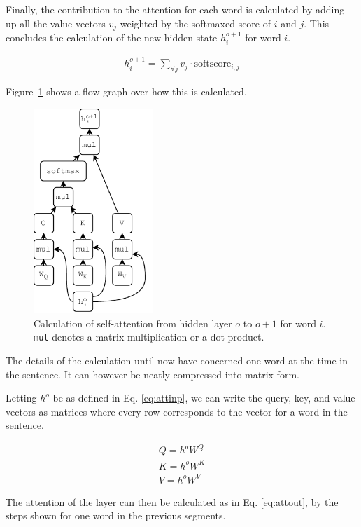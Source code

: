 Finally, the contribution to the attention for each word is calculated by adding up all the value vectors $v_j$ weighted by the softmaxed score of $i$ and $j$. This concludes the calculation of the new hidden state $h_i^{o+1}$ for word $i$. 

\begin{align}
    h_i^{o+1} = \sum\limits_{\forall j} v_j \cdot  \text{softscore}_{i,j} 
\end{align}

 Figure~\ref{fig:attflow} shows a flow graph over how this is calculated. 

\begin{figure}[ht]
    \centering
    \includegraphics[width=0.4\textwidth]{Figures/figs-self-att.pdf}
    \caption{Calculation of self-attention from hidden layer $o$ to $o+1$ for word $i$. \texttt{mul} denotes a matrix multiplication or a dot product.}
    \label{fig:attflow}
\end{figure}

The details of the calculation until now have concerned one word at the time in the sentence. It can however be neatly compressed into matrix form.

Letting $h^o$ be as defined in Eq. \ref{eq:attinp}, we can  write the query, key, and value vectors as matrices where every row corresponds to the vector for a word in the sentence. 

\begin{align}
    Q = h^o W^Q \\
    K = h^o W^K \\
    V = h^o W^V
\end{align}

The attention of the layer can then be calculated as in Eq. \ref{eq:attout}, by the steps shown for one word in the previous segments. 


